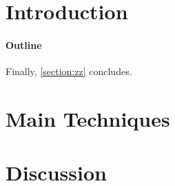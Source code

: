 \documentclass{article}
\begin{document}
\maketitle

\begin{flushright}
  \begin{minipage}{2.5in}
    \normalsize \rmfamily\scshape
    \color{red}{%
      Thou Mortal, Be Warned. \newline
      Thou Shallt Not Remove \newline
      This Commandment \newline
      While There Are Signs of Haste \newline
      in This Document!!!!\newline
    }
  \end{minipage}
\end{flushright}

\begin{abstract}
  
\end{abstract}

\section{Introduction}


\paragraph{Outline}
Finally, \cref{section:zz} concludes.

\section{Main Techniques}


\section{Discussion}




\end{document}
